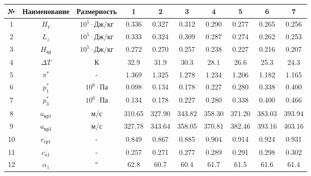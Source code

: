 \begin{landscape}
	\begin{center}
		\begin{longtable}{|c|c|c|c|c|c|c|c|c|c|}
			\hline
			\textbf{№} & 
			\textbf{Наименование} & 
			\textbf{Размерность} & 
			\textbf{1} & 
			\textbf{2} &
			\textbf{3} &
			\textbf{4} &
			\textbf{5} &
			\textbf{6} &
			\textbf{7} \\\hline
			\endhead
			
				1 & $H_т$ & $10^5 \cdot Дж/кг$ & 0.336 & 0.327 & 0.312 & 0.290 & 0.277 & 0.265 & 0.256 \\\hline
			
				2 & $L_z$ & $10^5 \cdot Дж/кг$ & 0.333 & 0.324 & 0.309 & 0.287 & 0.274 & 0.262 & 0.253 \\\hline
			
				3 & $H_{ад}$ & $10^5 \cdot Дж/кг$ & 0.272 & 0.270 & 0.257 & 0.238 & 0.227 & 0.216 & 0.207 \\\hline
			
				4 & $\Delta T$ & $К$ & 32.9 & 31.9 & 30.3 & 28.1 & 26.6 & 25.3 & 24.3 \\\hline
			
				5 & $\pi^*$ & - & 1.369 & 1.325 & 1.278 & 1.234 & 1.206 & 1.182 & 1.165 \\\hline
			
				6 & $p_1^*$ & $10^6 \cdot Па$ & 0.098 & 0.134 & 0.178 & 0.227 & 0.280 & 0.338 & 0.400 \\\hline
			
				7 & $p_3^*$ & $10^6 \cdot Па$ & 0.134 & 0.178 & 0.227 & 0.280 & 0.338 & 0.400 & 0.466 \\\hline
			
				8 & $a_{кр1}$ & $м/с$ & 310.65 & 327.90 & 343.82 & 358.30 & 371.20 & 383.03 & 393.94 \\\hline
			
				9 & $a_{кр3}$ & $м/с$ & 327.78 & 343.64 & 358.05 & 370.81 & 382.46 & 393.16 & 403.16 \\\hline
			
				10 & $\overline{r_{ср1}}$ & - & 0.849 & 0.867 & 0.885 & 0.904 & 0.914 & 0.924 & 0.931 \\\hline
			
				11 & $\overline{c_{u1}}$ & - & 0.257 & 0.271 & 0.277 & 0.289 & 0.291 & 0.298 & 0.302 \\\hline
			
				12 & $\alpha_1$ & $\degree$ & 62.8 & 60.7 & 60.4 & 61.7 & 61.5 & 61.6 & 61.4 \\\hline
			

\end{longtable}
\end{center}
\end{landscape}
